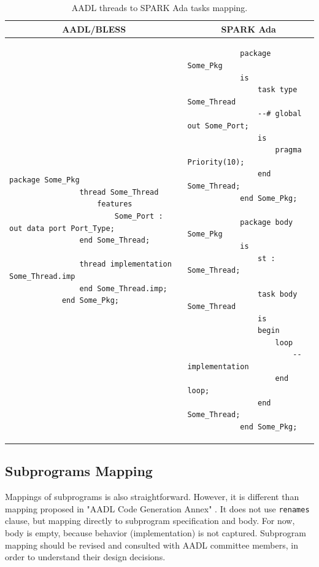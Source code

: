 \singlespacing
\begin{table}[!ht]
	\caption{AADL threads to SPARK Ada tasks mapping.}
	\label{table:threads2tasks}
	\centering
  	\begin{tabular}{ | p{3.5in} | p{2.5in} |}

		\hline
		\multicolumn{1}{|c|}{\textbf{AADL/BLESS}} & \multicolumn{1}{|c|}{\textbf{SPARK Ada}} \\ \hline

		\begin{lstlisting}[language=aadl]
			package Some_Pkg
				thread Some_Thread
					features
						Some_Port : out data port Port_Type;
				end Some_Thread;

				thread implementation Some_Thread.imp
				end Some_Thread.imp;
			end Some_Pkg;
		\end{lstlisting} 
		& 
		\begin{lstlisting}
			package Some_Pkg
			is
				task type Some_Thread
				--# global out Some_Port;
				is
					pragma Priority(10);
				end Some_Thread;
			end Some_Pkg;

			package body Some_Pkg
			is
				st : Some_Thread;

				task body Some_Thread
				is
				begin
					loop
						-- implementation
					end loop;
				end Some_Thread;
			end Some_Pkg;
		\end{lstlisting} 

		\\ \hline
	\end{tabular}
\end{table}
\doublespacing


\subsection{Subprograms Mapping}
\label{codegen:mapping:subprograms}

Mappings of subprograms is also straightforward. However, it is different than mapping proposed in "AADL Code Generation Annex" \cite{AnnexDoc}. It does not use \lstinline{renames} clause, but mapping directly to subprogram specification and body. For now, body is empty, because behavior (implementation) is not captured. Subprogram mapping should be revised and consulted with AADL committee members, in order to understand their design decisions.

